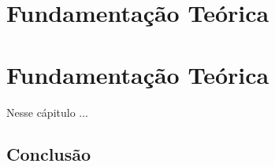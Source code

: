 \chapter{Fundamentação Teórica}
\label{cap:exemplos}

\chapter{Fundamentação Teórica}

Nesse cápitulo ...

\section{Conclusão}
